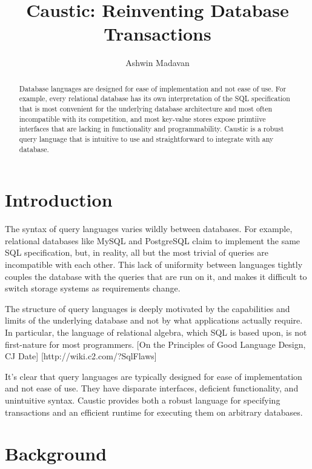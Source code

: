 \documentclass[12pt]{article}
\begin{document}
\title{Caustic: Reinventing Database Transactions}
\author{Ashwin Madavan}
\maketitle

\begin{abstract}
Database languages are designed for ease of implementation and not ease of use. For example, every relational database has its own interpretation of the SQL specification that is most convenient for the underlying database architecture and most often incompatible with its competition, and most key-value stores expose primtiive interfaces that are lacking in functionality and programmability. Caustic is a robust query language that is intuitive to use and straightforward to integrate with any database.
\end{abstract}

\section{Introduction}
The syntax of query languages varies wildly between databases. For example, relational databases like MySQL and PostgreSQL claim to implement the same SQL specification, but, in reality, all but the most trivial of queries are incompatible with each other. This lack of uniformity between languages tightly couples the database with the queries that are run on it, and makes it difficult to switch storage systems as requirements change.

The structure of query languages is deeply motivated by the capabilities and limits of the underlying database and not by what applications actually require. In particular, the language of relational algebra, which SQL is based upon, is not first-nature for most programmers. [On the Principles of Good Language Design, CJ Date] [http://wiki.c2.com/?SqlFlaws]

It's clear that query languages are typically designed for ease of implementation and not ease of use. They have disparate interfaces, deficient functionality, and unintuitive syntax. Caustic provides both a robust language for specifying transactions and an efficient runtime for executing them on arbitrary databases.

\section{Background}
\end{document}

